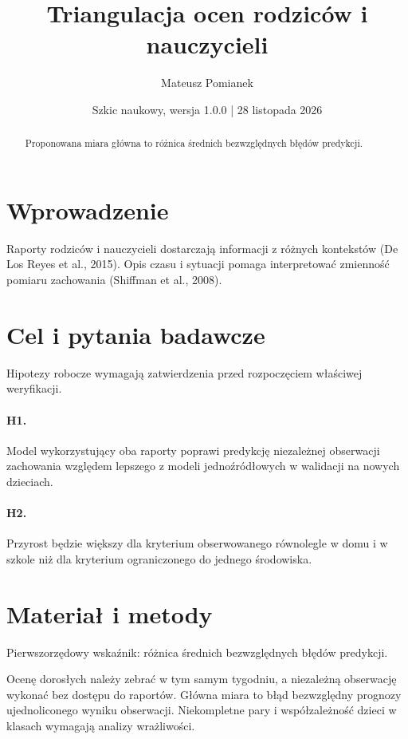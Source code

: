 \documentclass[11pt,a4paper]{article}
\title{Triangulacja ocen rodziców i nauczycieli}
\author{Mateusz Pomianek}
\date{Szkic naukowy, wersja 1.0.0 | 28 listopada 2026}
\begin{document}
\maketitle

\begin{abstract}

Proponowana miara główna to różnica średnich bezwzględnych błędów predykcji.

\end{abstract}

\section{Wprowadzenie}

Raporty rodziców i nauczycieli dostarczają informacji z różnych kontekstów (De Los Reyes et al., 2015). Opis czasu i sytuacji pomaga interpretować zmienność pomiaru zachowania (Shiffman et al., 2008).

\section{Cel i pytania badawcze}

Hipotezy robocze wymagają zatwierdzenia przed rozpoczęciem właściwej weryfikacji.

\paragraph{H1.} Model wykorzystujący oba raporty poprawi predykcję niezależnej obserwacji zachowania względem lepszego z modeli jednoźródłowych w walidacji na nowych dzieciach.

\paragraph{H2.} Przyrost będzie większy dla kryterium obserwowanego równolegle w domu i w szkole niż dla kryterium ograniczonego do jednego środowiska.

\section{Materiał i metody}

Pierwszorzędowy wskaźnik: różnica średnich bezwzględnych błędów predykcji.

Ocenę dorosłych należy zebrać w tym samym tygodniu, a niezależną obserwację wykonać bez dostępu do raportów. Główna miara to błąd bezwzględny prognozy ujednoliconego wyniku obserwacji. Niekompletne pary i współzależność dzieci w klasach wymagają analizy wrażliwości.
\end{document}
